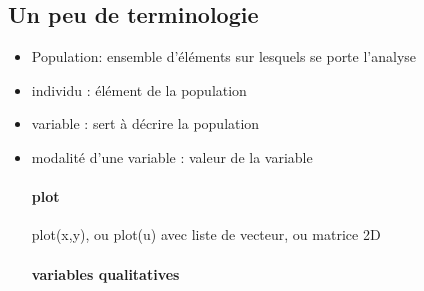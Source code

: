 \documentclass{article}
\begin{document}
\subsection{Un peu de terminologie}
\begin{itemize}
\item Population: ensemble d'éléments sur lesquels se porte l'analyse
\item individu : élément de la population
\item variable : sert à décrire la population
\item modalité d'une variable : valeur de la variable
\paragraph{plot} plot(x,y), ou plot(u) avec liste de vecteur, ou matrice 2D
\paragraph{variables qualitatives} 
\end{itemize}
\end{document}
